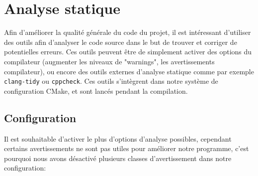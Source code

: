 \newpage
\section{Analyse statique}\label{sec:sanal}

Afin d'améliorer la qualité générale du code du projet, il est
intéressant d'utiliser des outils afin d'analyser le code source dans le
but de trouver et corriger de potentielles erreurs. Ces outils peuvent
être de simplement activer des options du compilateur (augmenter les
niveaux de "warnings", les avertissements compilateur), ou encore des
outils externes d'analyse statique comme par exemple \texttt{clang-tidy}
ou \texttt{cppcheck}. Ces outils s'intègrent dans notre système de
configuration CMake, et sont lancés pendant la compilation.

\subsection{Configuration}\label{configuration}

Il est souhaitable d'activer le plus d'options d'analyse possibles,
cependant certains avertissements ne sont pas utiles pour améliorer
notre programme, c'est pourquoi nous avons désactivé plusieurs classes
d'avertissement dans notre configuration:


